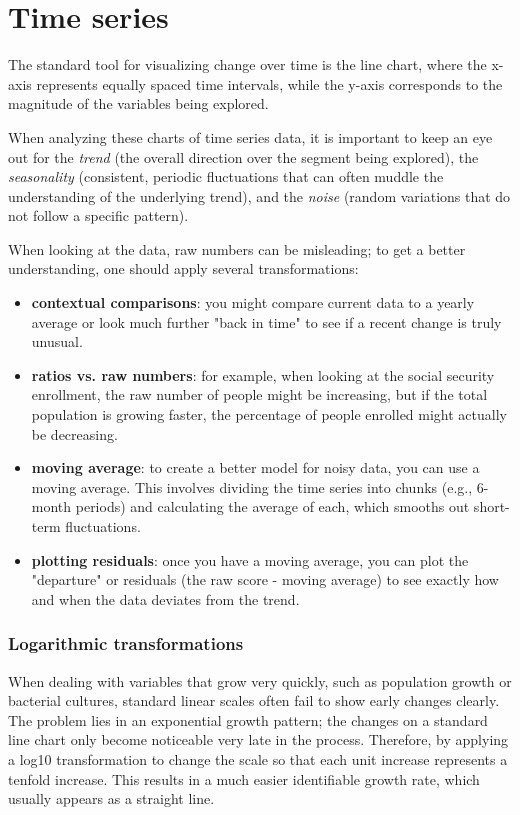 \section{Time series}
The standard tool for visualizing change over time is the line chart, where the x-axis represents equally spaced time intervals, while the y-axis corresponds to the magnitude of the variables being explored.\par
When analyzing these charts of time series data, it is important to keep an eye out for the \textit{trend} (the overall direction over the segment being explored), the \textit{seasonality} (consistent, periodic fluctuations that can often muddle the understanding of the underlying trend), and the \textit{noise} (random variations that do not follow a specific pattern).\par
When looking at the data, raw numbers can be misleading; to get a better understanding, one should apply several transformations:
\begin{itemize}[noitemsep]
    \item \textbf{contextual comparisons}: you might compare current data to a yearly average or look much further "back in time" to see if a recent change is truly unusual.
    \item \textbf{ratios vs. raw numbers}: for example, when looking at the social security enrollment, the raw number of people might be increasing, but if the total population is growing faster, the percentage of people enrolled might actually be decreasing.
    \item \textbf{moving average}: to create a better model for noisy data, you can use a moving average. This involves dividing the time series into chunks (e.g., 6-month periods) and calculating the average of each, which smooths out short-term fluctuations.
    \item \textbf{plotting residuals}: once you have a moving average, you can plot the "departure" or residuals (the raw score - moving average) to see exactly how and when the data deviates from the trend.
\end{itemize}

\subsubsection{Logarithmic transformations}
When dealing with variables that grow very quickly, such as population growth or bacterial cultures, standard linear scales often fail to show early changes clearly. The problem lies in an exponential growth pattern; the changes on a standard line chart only become noticeable very late in the process. Therefore, by applying a log10 transformation to change the scale so that each unit increase represents a tenfold increase. This results in a much easier identifiable growth rate, which usually appears as a straight line.